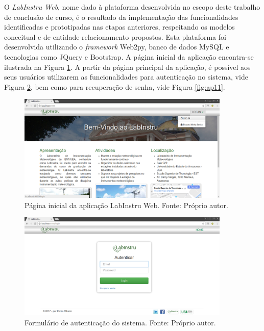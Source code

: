 O \emph{LabInstru Web}, nome dado à plataforma desenvolvida no escopo deste trabalho de conclusão de curso, é o resultado da implementação das funcionalidades identificadas e prototipadas nas etapas anteriores, respeitando os modelos conceitual e de entidade-relacionamento propostos. Esta plataforma foi desenvolvida utilizando o \emph{framework} Web2py, banco de dados MySQL e tecnologias como JQuery e Bootstrap. A página inicial da aplicação encontra-se ilustrada na Figura \ref{fig:ap1}. A partir da página principal da aplicação, é possível aos seus usuários utilizarem as funcionalidades para autenticação no sistema, vide Figura \ref{fig:ap10}, bem como para recuperação de senha, vide Figura  \ref{fig:ap11}.

\begin{figure}[h!]
	\centering
	\includegraphics[width=0.9\textwidth]{./img/ap1.png}
	\caption{Página inicial da aplicação LabInstru Web. Fonte: Próprio autor.} \label{fig:ap1}
\end{figure}

\begin{figure}[h!]
	\centering
	\includegraphics[width=0.9\textwidth]{./img/ap10.png}
	\caption{Formulário de autenticação do sistema. Fonte: Próprio autor.} \label{fig:ap10}
\end{figure}



